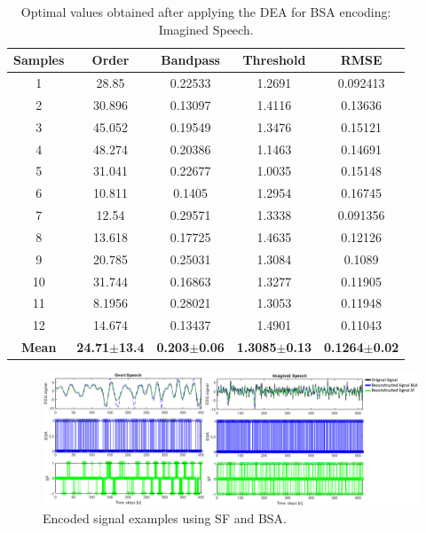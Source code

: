 \begin{table}[h!]
	\centering
	\caption{Optimal values obtained after applying the DEA for BSA encoding: Imagined Speech.}
	\begin{tabular}{|*{5}{c|}}
		\hline
		\textbf{Samples} & \textbf{Order} & \textbf{Bandpass} & \textbf{Threshold} & \textbf{RMSE} \\\hline
		1 & 28.85 & 0.22533 & 1.2691 & 0.092413 \\\hline
		2 & 30.896 & 0.13097 & 1.4116 & 0.13636 \\\hline
		3 & 45.052 & 0.19549 & 1.3476 & 0.15121 \\\hline
		4 & 48.274 & 0.20386 & 1.1463 & 0.14691 \\\hline
		5 & 31.041 & 0.22677 & 1.0035 & 0.15148 \\\hline
		6 & 10.811 & 0.1405 & 1.2954 & 0.16745 \\\hline
		7 & 12.54 & 0.29571 & 1.3338 & 0.091356 \\\hline
		8 & 13.618 & 0.17725 & 1.4635 & 0.12126 \\\hline
		9 & 20.785 & 0.25031 & 1.3084 & 0.1089 \\\hline
		10 & 31.744 & 0.16863 & 1.3277 & 0.11905 \\\hline
		11 & 8.1956 & 0.28021 & 1.3053 & 0.11948 \\\hline
		12 & 14.674 & 0.13437 & 1.4901 & 0.11043 \\\hline
		\textbf{Mean}  & \textbf{24.71$\pm$13.4} &\textbf{ 0.203$\pm$0.06} & \textbf{1.3085$\pm$0.13} & \textbf{0.1264$\pm$0.02} \\\hline
	    \end{tabular}%
	\label{Table: BSA_Imagined}%
\end{table}%

\begin{figure}[h!]
\centering
\includegraphics[width=\linewidth]{Figures/Encoded_Signals.png}
\caption{Encoded signal examples using SF and BSA.}
\label{Fig: Encoded_Signals}
\end{figure}

